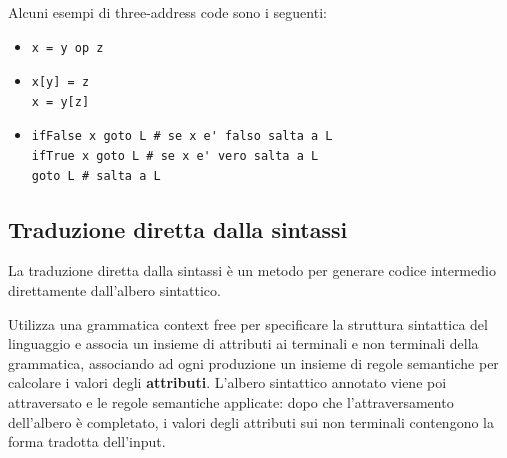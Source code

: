 \documentclass[a4paper]{article}
\begin{document}
\begin{example}
  Alcuni esempi di three-address code sono i seguenti:
  \begin{itemize}
    \item 
\begin{lstlisting}[numbers=none]
x = y op z
\end{lstlisting}

    \item 
\begin{lstlisting}[numbers=none]
x[y] = z
x = y[z]
\end{lstlisting}

    \item 
\begin{lstlisting}[numbers=none]
ifFalse x goto L # se x e' falso salta a L
ifTrue x goto L # se x e' vero salta a L
goto L # salta a L
\end{lstlisting}
  \end{itemize}
\end{example}

\subsection{Traduzione diretta dalla sintassi}
La traduzione diretta dalla sintassi è un metodo per generare codice intermedio 
direttamente dall'albero sintattico.

Utilizza una grammatica context free per specificare la struttura sintattica del linguaggio
e associa un insieme di attributi ai terminali e non terminali della grammatica, associando
ad ogni produzione un insieme di regole semantiche per calcolare i valori degli
\textbf{attributi}. L'albero sintattico annotato viene poi attraversato e le regole
semantiche applicate: dopo che l'attraversamento dell'albero è completato, i valori
degli attributi sui non terminali contengono la forma tradotta dell'input.
\end{document}
